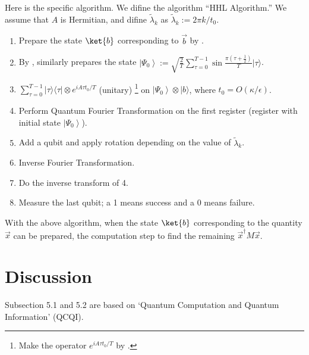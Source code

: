 \documentclass[b5paper,papersize,dvipdfmx,fleqn]{article}
\begin{document}
Here is the specific algorithm. We difine the algorithm ``HHL Algorithm.'' We assume that $A$ is Hermitian, and difine $\tilde{\lambda}_{k}$ as $
\tilde{\lambda}_{k}:=2 \pi k / t_{0}
$.
\begin{enumerate}
  \item Prepare the state $\ket{b}$ corresponding to $\vec{b}$ by \cite{Grover2002}.
  \item By \cite{Grover2002}, similarly prepares the state $\displaystyle \left|\Psi_{0}\right\rangle:=\sqrt{\frac{2}{T}}\sum_{\tau=0}^{T-1}\sin \frac{\pi\left(\tau+\frac{1}{2}\right)}{T}|\tau\rangle$.
  \item $\displaystyle \sum_{\tau=0}^{T-1}|\tau\rangle\langle\tau| \otimes e^{i A \tau t_{0} / T}$ (unitary) \footnote{Make the operator $e^{i A \tau t_{0} / T}$ by \cite{Berry2007}.}  on $\left|\Psi_{0}\right\rangle \otimes|b\rangle$, where $t_{0}=O(\kappa / \epsilon)$.
\item  Perform Quantum Fourier Transformation on the first register (register with initial state $\left|\Psi_{0}\right\rangle$).
  \item Add a qubit and apply rotation depending on the value of $\tilde{\lambda}_{k}$.
  \item Inverse Fourier Transformation.
  \item Do the inverse transform of 4.
  \item Measure the last qubit; a 1 means success and a 0 means failure.
\end{enumerate}
With the above algorithm, when the state $\ket{b}$ corresponding to the quantity $\vec{x}$ can be prepared, the computation step to find the remaining $\vec{x}^\dagger M\vec{x}$.



\section{Discussion}

Subsection 5.1 and 5.2 are based on `Quantum Computation and Quantum Information' (QCQI).
\end{document}
